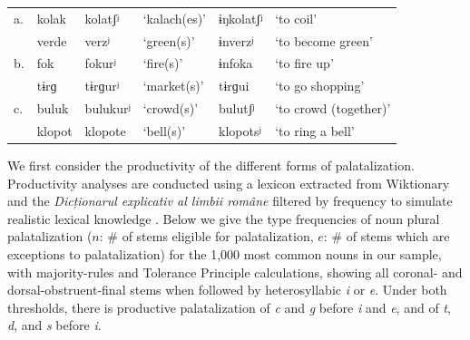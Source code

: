 \documentclass[11pt,letterpaper]{article}
\newcommand{\word}[1]{\textit{#1}}
\begin{document}
\begin{unlabeledexample}
\begin{tabular}{l lll ll}
a. & kola{k}  & kola{tʃ}ʲ & `kalach(es)' & ɨŋkola{tʃ}ʲ & `to coil' \\
   & verde    & verzʲ     & `green(s)'   & ɨnverzʲ     & `to become green' \\
b. & fok      & fokurʲ    & `fire(s)'    & ɨnfoka      & `to fire up' \\
   & tɨrɡ     & tɨrɡurʲ   & `market(s)'  & tɨrɡui      & `to go shopping' \\
c. & buluk    & bulukurʲ  & `crowd(s)'   & bulutʃʲ     & `to crowd (together)' \\
   & klopo{t} & klopo{t}e & `bell(s)'    & klopo{ts}ʲ  & `to ring a bell' \\
\end{tabular}
\label{e:steriade}
\end{unlabeledexample}

We first consider the productivity of the different forms of palatalization.
Productivity analyses are conducted using a lexicon extracted from Wiktionary and the \emph{Dicționarul explicativ al limbii române} \citep[DEX;][]{DEX}
filtered by frequency \citep{LCC} to simulate realistic lexical knowledge \citep[e.g.,][]{Kodner:19}.
Below we give the type frequencies of noun plural palatalization ($n$: \# of stems eligible for palatalization,
$e$: \# of stems which are exceptions to palatalization) for the 1,000 most common nouns in our sample, 
with majority-rules \citep[14]{Nida:49} and Tolerance Principle \citep{Yang:05,Yang:16} calculations,
showing all coronal- and dorsal-obstruent-final stems when followed by heterosyllabic \word{i} or \word{e}.
Under both thresholds, there is productive palatalization of \word{c} and \word{g} before \word{i} and \word{e},
and of \word{t}, \word{d}, and \word{s} before \word{i}.
\end{document}
